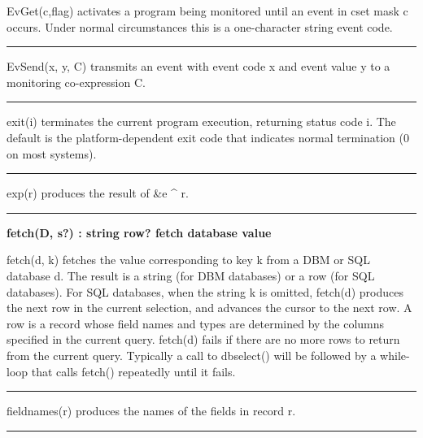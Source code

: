 \noindent
EvGet(c,flag) activates a program being monitored until an event in cset
mask c occurs. Under normal circumstances this is a one-character
string event code.

\bigskip\hrule\vspace{0.1cm}

\noindent
{}EvSend(x, y, C) transmits an event with event
code x and event value y to a monitoring co-expression C.

\bigskip\hrule\vspace{0.1cm}

\noindent
{}exit(i) terminates the current program execution,
returning status code i. The default is the platform-dependent exit
code that indicates normal termination (0 on most systems).

\bigskip\hrule\vspace{0.1cm}

\noindent
{}exp(r) produces the result of \&e \^{} r.

\bigskip\hrule\vspace{0.1cm}
\noindent
{\bf fetch(D, s?) : string {\textbar} row? \hfill fetch database value}

\noindent
{}fetch(d, k) fetches the value corresponding to key k
from a DBM or SQL database d. The result is
a string (for DBM databases) or a row (for SQL databases). For SQL
databases, when the string k is omitted, fetch(d) produces the next row
in the current selection, and advances the cursor to the next row. A
row is a record whose field names and types are determined by the
columns specified in the current query. fetch(d) fails if there are no
more rows to return from the current query. Typically a call to
dbselect() will be followed by a while{}-loop that calls fetch()
repeatedly until it fails.

\bigskip\hrule\vspace{0.1cm}

\noindent
{}fieldnames(r) produces the names of the fields in
record r.

\bigskip\hrule\vspace{0.1cm}

